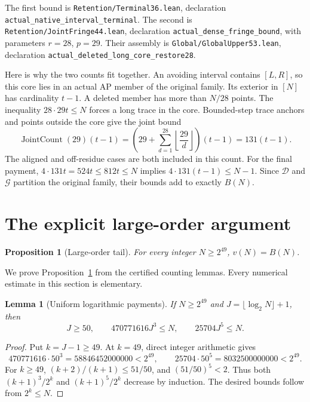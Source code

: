 \documentclass[11pt,a4paper]{article}
\newtheorem{proposition}[theorem]{Proposition}
\newtheorem{lemma}[theorem]{Lemma}
\theoremstyle{definition}\newtheorem{definition}[theorem]{Definition}
\newcommand{\G}{\mathcal G}
\newcommand{\D}{\mathcal D}
\newcommand{\code}[1]{{\small\nolinkurl{#1}}}
\begin{document}
The first bound is
\code{Retention/Terminal36.lean}, declaration
\code{actual_native_interval_terminal}.
The second is \code{Retention/JointFringe44.lean}, declaration
\code{actual_dense_fringe_bound}, with parameters $r=28$, $p=29$.
Their assembly is \code{Global/GlobalUpper53.lean}, declaration
\code{actual_deleted_long_core_restore28}.

Here is why the two counts fit together. An avoiding interval contains
$[L,R]$, so this core lies in an actual AP member of the original family.
Its exterior in $[N]$ has cardinality $t-1$. A deleted member has more
than $N/28$ points. The inequality $28\cdot29t\le N$ forces a long
trace in the core. Bounded-step trace anchors and points outside the core
give the joint bound
\[
 \operatorname{JointCount}(29)(t-1)
 =\left(29+\sum_{d=1}^{28}\left\lfloor\frac{29}{d}\right\rfloor\right)(t-1)
 =131(t-1).
\]
The aligned and off-residue cases are both included in this count.
For the final payment, $4\cdot131t=524t\le812t\le N$ implies
$4\cdot131(t-1)\le N-1$. Since $\D$ and $\G$ partition the original
family, their bounds add to exactly $B(N)$.

\section{The explicit large-order argument}
\begin{proposition}[Large-order tail]\label{prop:tail}
For every integer $N\ge2^{49}$, $v(N)=B(N)$.
\end{proposition}
We prove Proposition~\ref{prop:tail} from the certified counting lemmas.
Every numerical estimate in this section is elementary.

\begin{lemma}[Uniform logarithmic payments]\label{lem:gates}
If $N\ge2^{49}$ and $J=\lfloor\log_2N\rfloor+1$, then
\begin{equation}\label{eq:gates}
 J\ge50,\qquad470771616J^3\le N,\qquad25704J^5\le N.
\end{equation}
\end{lemma}
\begin{proof}
Put $k=J-1\ge49$. At $k=49$, direct integer arithmetic gives
\[
 470771616\cdot50^3=58846452000000<2^{49},\qquad
 25704\cdot50^5=8032500000000<2^{49}.
\]
For $k\ge49$, $(k+2)/(k+1)\le51/50$, and $(51/50)^5<2$.
Thus both $(k+1)^3/2^k$ and $(k+1)^5/2^k$ decrease by induction.
The desired bounds follow from $2^k\le N$.
\end{proof}
\end{document}
